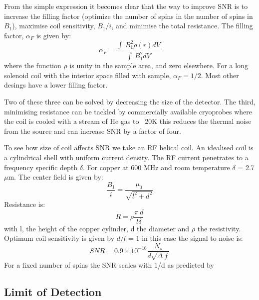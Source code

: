 From the simple expression it becomes clear that the way to improve SNR is to increase the filling factor
(optimize the number of spins in the number of spins in $B_1$), maximise coil sensitivity, $B_1/i$, and
minimise the total resistance. The filling factor, $\alpha_F$ is given by:
\begin{equation}\label{eqn:FillingFactor}
  \alpha_F = \frac{\int~B_1^2\rho(r)dV}{\int~B_1^2dV}
\end{equation}
where the function $\rho$ is unity in the sample area, and zero elsewhere. For a long solenoid coil with the
interior space filled with sample, $\alpha_F = 1/2$. Most other desings have a lower filling factor.

Two of these three can be solved by decreasing the size of the detector. The third, minimising resistance
can be tackled by commercially available cryoprobes where the coil is cooled with a stream of He gas to
~20K this reduces the thermal noise from the source and can increase SNR by a factor of four.

To see how size of coil affects SNR we take an RF helical coil. An idealised coil
is a cylindrical shell with uniform current density. The RF current penetrates to a frequency
specific depth $\delta$. For copper at 600 MHz and room temperature $\delta$ = 2.7 $\mu$m. The center
field is given by:
\begin{equation}
  \frac{B_1}{i} = \frac{\mu_0}{\sqrt{l^2+d^2}}
\end{equation}
Resistance is:
\begin{equation}
  R = \rho\frac{\pi~d}{l\delta}
\end{equation}
with l, the height of the copper cylinder, d the diameter and $\rho$ the resistivity.
Optimum coil sensitivity is given by $d/l$ = $1$ in this case the signal to noise is:
\begin{equation}
  SNR = 0.9\times10^{-16}\frac{N_s}{d\sqrt{\Delta~f}}
\end{equation}
For a fixed number of spins the SNR scales with 1/d as predicted by \citep{Hoult:1976dw}

\subsection{Limit of Detection}

